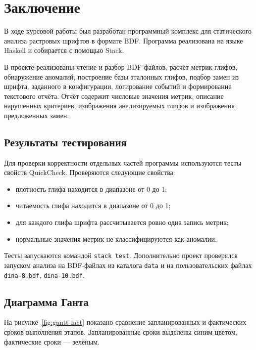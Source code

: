 \section{Заключение}
\label{sec:conclusion}

В ходе курсовой работы был разработан программный комплекс для статического анализа растровых шрифтов в формате BDF. Программа реализована на языке Haskell и собирается с помощью Stack.

В проекте реализованы чтение и разбор BDF-файлов, расчёт метрик глифов, обнаружение аномалий, построение базы эталонных глифов, подбор замен из шрифта, заданного в конфигурации, логирование событий и формирование текстового отчёта. Отчёт содержит числовые значения метрик, описание нарушенных критериев, изображения анализируемых глифов и изображения предложенных замен.

\subsection{Результаты тестирования}

Для проверки корректности отдельных частей программы используются тесты свойств QuickCheck. Проверяются следующие свойства:

\begin{itemize}
    \item плотность глифа находится в диапазоне от 0 до 1;
    \item читаемость глифа находится в диапазоне от 0 до 1;
    \item для каждого глифа шрифта рассчитывается ровно одна запись метрик;
    \item нормальные значения метрик не классифицируются как аномалии.
\end{itemize}

Тесты запускаются командой \texttt{stack test}. Дополнительно проект проверялся запуском анализа на BDF-файлах из каталога \texttt{data} и на пользовательских файлах \texttt{dina-8.bdf}, \texttt{dina-10.bdf}.

\subsection{Диаграмма Ганта}

На рисунке~\ref{fig:gantt-fact} показано сравнение запланированных и фактических сроков выполнения этапов. Запланированные сроки выделены синим цветом, фактические сроки --- зелёным.


